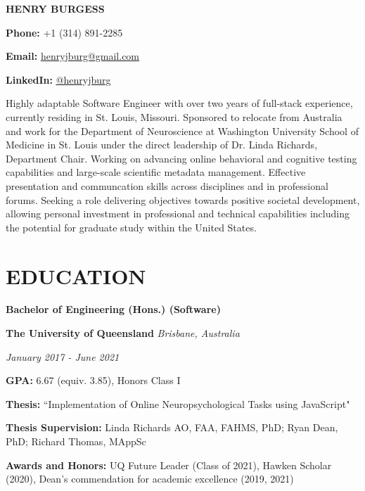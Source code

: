 \documentclass{article}
\begin{document}
  {\Huge\textbf{\uppercase{Henry Burgess}}} \hfill \begin{minipage}{0.26\linewidth}

  \textbf{Phone:} +1 (314) 891-2285

  \textbf{Email:} \href{mailto:henryjburg@gmail.com}{\color{blue}\underline{henryjburg@gmail.com}}

  \textbf{LinkedIn:} \href{https://www.linkedin.com/in/henryjburg/}{\color{blue}\underline{@henryjburg}}

  \end{minipage}

  \medbreak

  Highly adaptable Software Engineer with over two years of full-stack experience, currently residing in St. Louis, Missouri.
  Sponsored to relocate from Australia and work for the Department of Neuroscience at Washington University School of Medicine in St. Louis under the direct leadership of Dr. Linda Richards, Department Chair.
  Working on advancing online behavioral and cognitive testing capabilities and large-scale scientific metadata management. Effective presentation and communcation skills across disciplines and in professional forums.
  Seeking a role delivering objectives towards positive societal development, allowing personal investment in professional and technical capabilities including the potential for graduate study within the United States.

  \section*{\centering\uppercase{Education}}

  {\large\textbf{Bachelor of Engineering (Hons.) (Software)}}

  \medbreak

  \textbf{The University of Queensland} \hfill \textit{Brisbane, Australia}

  \textit{January 2017 - June 2021}

  \textbf{GPA:} 6.67 (equiv. 3.85), Honors Class I

  \textbf{Thesis:} ``Implementation of Online Neuropsychological Tasks using JavaScript"

  \textbf{Thesis Supervision:} Linda Richards AO, FAA, FAHMS, PhD; Ryan Dean, PhD; Richard Thomas, MAppSc

  \textbf{Awards and Honors:} UQ Future Leader (Class of 2021), Hawken Scholar (2020), Dean's commendation for academic excellence (2019, 2021)
\end{document}
